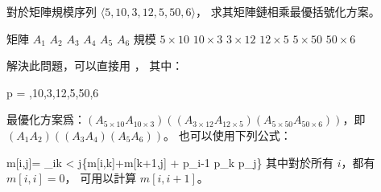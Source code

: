 \startEXERCISE
對於矩陣規模序列 $\langle 5,10,3,12,5,50,6\rangle$，
求其矩陣鏈相乘最優括號化方案。
\stopEXERCISE

\startANSWER
\bTABLE[align=center,frame=off,offset=.2cm]
\setupTABLE[r][1][bottomframe=on]
\setupTABLE[c][1][rightframe=on]
\bTR \bTD 矩陣   \eTD
  \bTD $A_1$ \eTD
  \bTD $A_2$ \eTD
  \bTD $A_3$ \eTD
  \bTD $A_4$ \eTD
  \bTD $A_5$ \eTD
  \bTD $A_6$ \eTD
\eTR
\bTR \bTD 規模 \eTD
  \bTD $5\times10$ \eTD
  \bTD $10\times3$ \eTD
  \bTD $3\times12$ \eTD
  \bTD $12\times5$ \eTD
  \bTD $5\times50$ \eTD
  \bTD $50\times6$ \eTD
\eTR
\eTABLE

解決此問題，可以直接用 ，
其中：

\startformula
p = ,10,3,12,5,50,6\rangle
\stopformula

最優化方案爲：$(A_{5\times10}A_{10\times3})
\left((A_{3\times12}A_{12\times5})
      (A_{5\times50}A_{50\times6})
\right)$，即 $(A_1 A_2)\left((A_3 A_4)(A_5 A_6)\right)$。
也可以使用下列公式：

\startformula
m[i,j]=\startmathcases
{} \NC {} \NR
\NC \min_{i\le k < j}\left\{m[i,k]+m[k+1,j] + p_{i-1} p_k p_j\right\} \NC {} \NR
\stopmathcases
\stopformula
其中對於所有 $i$，都有 $m[i,i] = 0$，
可用以計算 $m[i,i+1]$。
\blank[.5cm]
\externalfigure[e14_2_1-1]
\stopANSWER
